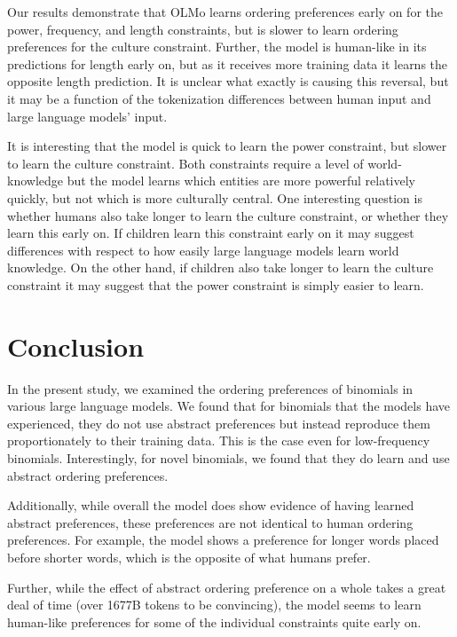 \documentclass[
  12pt,
  letterpaper,
]{scrreport}
\begin{document}
Our results demonstrate that OLMo learns ordering preferences early on
for the power, frequency, and length constraints, but is slower to learn
ordering preferences for the culture constraint. Further, the model is
human-like in its predictions for length early on, but as it receives
more training data it learns the opposite length prediction. It is
unclear what exactly is causing this reversal, but it may be a function
of the tokenization differences between human input and large language
models' input.

It is interesting that the model is quick to learn the power constraint,
but slower to learn the culture constraint. Both constraints require a
level of world-knowledge but the model learns which entities are more
powerful relatively quickly, but not which is more culturally central.
One interesting question is whether humans also take longer to learn the
culture constraint, or whether they learn this early on. If children
learn this constraint early on it may suggest differences with respect
to how easily large language models learn world knowledge. On the other
hand, if children also take longer to learn the culture constraint it
may suggest that the power constraint is simply easier to learn.

\section{Conclusion}\label{conclusion-1}

In the present study, we examined the ordering preferences of binomials
in various large language models. We found that for binomials that the
models have experienced, they do not use abstract preferences but
instead reproduce them proportionately to their training data. This is
the case even for low-frequency binomials. Interestingly, for novel
binomials, we found that they do learn and use abstract ordering
preferences.

Additionally, while overall the model does show evidence of having
learned abstract preferences, these preferences are not identical to
human ordering preferences. For example, the model shows a preference
for longer words placed before shorter words, which is the opposite of
what humans prefer.

Further, while the effect of abstract ordering preference on a whole
takes a great deal of time (over 1677B tokens to be convincing), the
model seems to learn human-like preferences for some of the individual
constraints quite early on.
\end{document}
